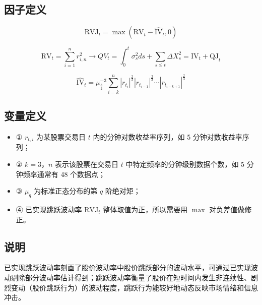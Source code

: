 \documentclass{article}
\begin{document}
\subsection{因子定义}

\begin{equation}
    \mathrm{RVJ}_t = \max\left(\mathrm{RV}_t - \hat{\mathrm{IV}}_t, 0\right)
\end{equation}

\begin{equation}
    \mathrm{RV}_t = \sum_{i=1}^{n} r_{i,n}^2 \rightarrow QV_t = \int_0^t \sigma_s^2 ds + \sum_{s \leq t} \Delta X_s^2 = \mathrm{IV}_t + \mathrm{QJ}_t
\end{equation}

\begin{equation}
    \hat{\mathrm{IV}}_t = \mu_{\frac{3}{2}}^{-3} \sum_{i=k}^{n} |r_{t_i}|^{\frac{2}{3}} |r_{t_{i-1}}|^{\frac{2}{3}} \cdots |r_{t_{i-k+1}}|^{\frac{2}{3}}
\end{equation}

\subsection{变量定义}
\begin{itemize}
    \item ① \( r_{t,i} \) 为某股票交易日 \( t \) 内的分钟对数收益率序列，如 5 分钟对数收益率序列；
    \item ② \( k=3 \)，\( n \) 表示该股票在交易日 \( t \) 中特定频率的分钟级别数据个数，如 5 分钟频率通常有 48 个数据点；
    \item ③ \( \mu_q \) 为标准正态分布的第 \( q \) 阶绝对矩；
    \item ④ 已实现跳跃波动率 \( \mathrm{RVJ}_t \) 整体取值为正，所以需要用 \( \max \) 对负差值做修正。
\end{itemize}

\subsection{说明}
已实现跳跃波动率刻画了股价波动率中股价跳跃部分的波动水平，可通过已实现波动剔除部分波动率估计得到；跳跃波动率衡量了股价在短时间内发生非连续性、剧烈变动（股价跳跃行为）的波动程度，跳跃行为能较好地动态反映市场情绪和信息冲击。
\end{document}
